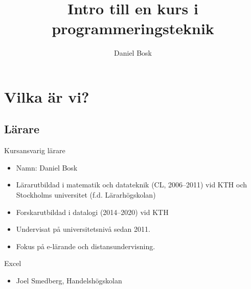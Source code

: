 \title{%
  Intro till en kurs i programmeringsteknik
}
\author{Daniel Bosk}


\mode*

\begin{abstract}
  
\end{abstract}


\section{Vilka är vi?}

\subsection{Lärare}

\begin{frame}
  \begin{block}{Kursansvarig lärare}
    \begin{itemize}
      \item Namn: Daniel Bosk
      \item Lärarutbildad i matematik och datateknik (CL, 2006--2011) vid KTH 
        och Stockholms universitet (f.d. Lärarhögskolan)
      \item Forskarutbildad i datalogi (2014--2020) vid KTH
      \item Undervisat på universitetsnivå sedan 2011.
      \item Fokus på e-lärande och distansundervisning.
    \end{itemize}
  \end{block}
\end{frame}

\begin{frame}
  \begin{block}{Excel}
    \begin{itemize}
      \item Joel Smedberg, Handelshögskolan
    \end{itemize}
  \end{block}
\end{frame}

